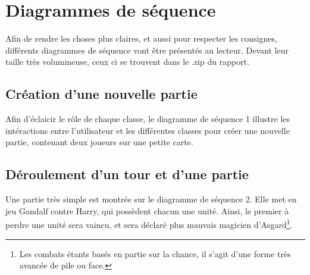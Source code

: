 \newpage
\section{Diagrammes de séquence}
	Afin de rendre les choses plus claires, et aussi pour respecter les consignes, différents diagrammes de séquence vont être présentés au lecteur.
	Devant leur taille très volumineuse, ceux ci se trouvent dans le .zip du rapport.

	\subsection{Création d'une nouvelle partie}
		Afin d'éclaicir le rôle de chaque classe, le diagramme de séquence 1 illustre les intéractions entre l'utilisateur et les différentes classes pour créer une nouvelle partie, contenant deux joueurs sur une petite carte.


	\subsection{Déroulement d'un tour et d'une partie}
		Une partie très simple est montrée sur le diagramme de séquence 2. Elle met en jeu Gandalf contre Harry, qui possèdent chacun une unité. Ainsi, le premier à perdre une unité sera vaincu, et sera déclaré plus mauvais magicien d'Asgard\footnote{Les combats étants basés en partie sur la chance, il s'agit d'une forme très avancée de pile ou face.}.




	